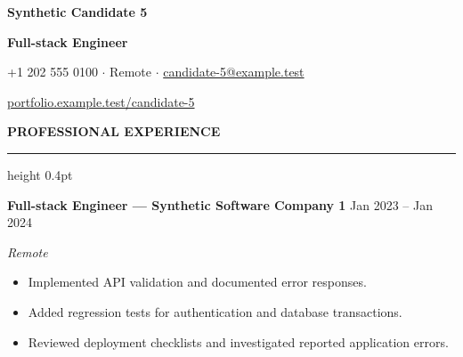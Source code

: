 \documentclass[10pt,a4paper]{article}
\newcommand{\atsHeaderToSection}{10pt}
\newcommand{\atsHeadingToContent}{3pt}
\newcommand{\atsRoleToMetadata}{1.5pt}
\newcommand{\atsMetadataToBullets}{2.5pt}
\newcommand{\atsBulletToBullet}{1.2pt}
\newcommand{\atsfirstsection}[1]{%
  \vspace{\atsHeaderToSection}%
  {\noindent\large\bfseries\uppercase{#1}}\par
  \vspace{1.5pt}\hrule height 0.4pt\vspace{\atsHeadingToContent}%
}
\begin{document}
{\centering
  {\Huge \textbf{Synthetic Candidate 5}}\par
  \vspace{3pt}
  {\large \textbf{Full-stack Engineer}}\par
  \vspace{3pt}
  {\small +1 202 555 0100 $\cdot$ Remote $\cdot$ \href{mailto:candidate-5@example.test}{candidate-5@example.test}}\par
  \vspace{2pt}
  {\small \href{https://portfolio.example.test/candidate-5}{portfolio.example.test/candidate-5}}\par
}

\atsfirstsection{Professional Experience}
\textbf{Full-stack Engineer — Synthetic Software Company 1} \hfill Jan 2023 -- Jan 2024\par
\vspace{\atsRoleToMetadata}
{\small\textit{Remote}}\par
\vspace{\atsMetadataToBullets}
\begin{itemize}
\setlength{\itemsep}{\atsBulletToBullet}\setlength{\parskip}{0pt}\setlength{\parsep}{0pt}\setlength{\topsep}{0pt}\setlength{\partopsep}{0pt}
  \item Implemented API validation and documented error responses.
  \item Added regression tests for authentication and database transactions.
  \item Reviewed deployment checklists and investigated reported application errors.
\end{itemize}
\end{document}
